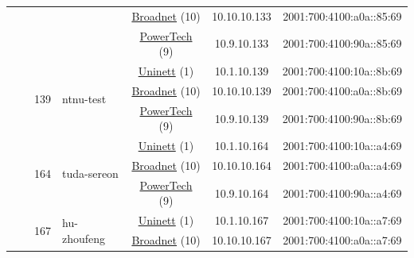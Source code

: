 \begin{small}
\begin{center}
\begin{longtable}{|c|c|c|c|c|c|c|c|}
  &  &  &  & \multicolumn{2}{|c|}{\tiny{\href{https://www.broadnet.no}{Broadnet} (10)}} & \tiny{10.10.10.133} & \tiny{2001:700:4100:a0a::85:69} \\* \cline{5-5}\cline{6-6}\cline{7-7}\cline{8-8}
  &  &  &  & \multicolumn{2}{|c|}{\tiny{\href{http://www.powertech.no}{PowerTech} (9)}} & \tiny{10.9.10.133} & \tiny{2001:700:4100:90a::85:69} \\* \cline{3-3}\cline{4-4}\cline{5-5}\cline{6-6}\cline{7-7}\cline{8-8}
  &  & \multirow{3}{*}{\tiny{139}} & \multicolumn{1}{|l|}{\multirow{3}{*}{\tiny{ntnu-test}}} & \multicolumn{2}{|c|}{\tiny{\href{https://www.uninett.no}{Uninett} (1)}} & \tiny{10.1.10.139} & \tiny{2001:700:4100:10a::8b:69} \\* \cline{5-5}\cline{6-6}\cline{7-7}\cline{8-8}
  &  &  &  & \multicolumn{2}{|c|}{\tiny{\href{https://www.broadnet.no}{Broadnet} (10)}} & \tiny{10.10.10.139} & \tiny{2001:700:4100:a0a::8b:69} \\* \cline{5-5}\cline{6-6}\cline{7-7}\cline{8-8}
  &  &  &  & \multicolumn{2}{|c|}{\tiny{\href{http://www.powertech.no}{PowerTech} (9)}} & \tiny{10.9.10.139} & \tiny{2001:700:4100:90a::8b:69} \\* \cline{3-3}\cline{4-4}\cline{5-5}\cline{6-6}\cline{7-7}\cline{8-8}
  &  & \multirow{3}{*}{\tiny{164}} & \multicolumn{1}{|l|}{\multirow{3}{*}{\tiny{tuda-sereon}}} & \multicolumn{2}{|c|}{\tiny{\href{https://www.uninett.no}{Uninett} (1)}} & \tiny{10.1.10.164} & \tiny{2001:700:4100:10a::a4:69} \\* \cline{5-5}\cline{6-6}\cline{7-7}\cline{8-8}
  &  &  &  & \multicolumn{2}{|c|}{\tiny{\href{https://www.broadnet.no}{Broadnet} (10)}} & \tiny{10.10.10.164} & \tiny{2001:700:4100:a0a::a4:69} \\* \cline{5-5}\cline{6-6}\cline{7-7}\cline{8-8}
  &  &  &  & \multicolumn{2}{|c|}{\tiny{\href{http://www.powertech.no}{PowerTech} (9)}} & \tiny{10.9.10.164} & \tiny{2001:700:4100:90a::a4:69} \\* \cline{3-3}\cline{4-4}\cline{5-5}\cline{6-6}\cline{7-7}\cline{8-8}
  &  & \multirow{3}{*}{\tiny{167}} & \multicolumn{1}{|l|}{\multirow{3}{*}{\tiny{hu-zhoufeng}}} & \multicolumn{2}{|c|}{\tiny{\href{https://www.uninett.no}{Uninett} (1)}} & \tiny{10.1.10.167} & \tiny{2001:700:4100:10a::a7:69} \\* \cline{5-5}\cline{6-6}\cline{7-7}\cline{8-8}
  &  &  &  & \multicolumn{2}{|c|}{\tiny{\href{https://www.broadnet.no}{Broadnet} (10)}} & \tiny{10.10.10.167} & \tiny{2001:700:4100:a0a::a7:69} \\* \cline{5-5}\cline{6-6}\cline{7-7}\cline{8-8}

\end{longtable}
\end{center}
\end{small}
